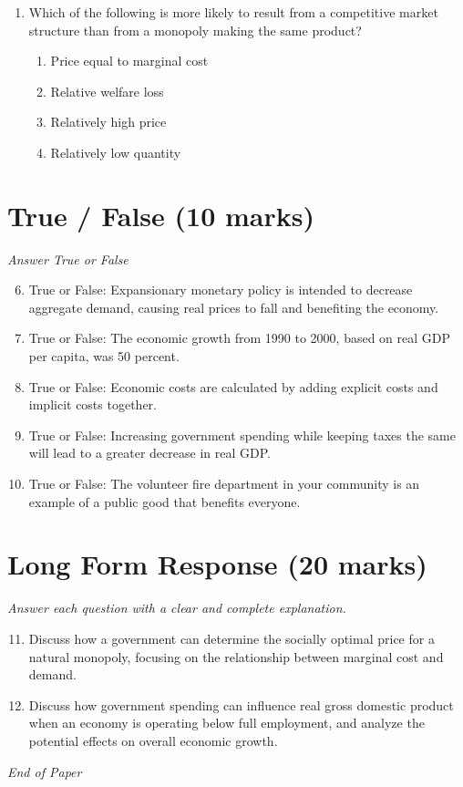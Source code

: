 \documentclass[12pt]{article}
\begin{document}
\begin{enumerate}[label=\arabic*.]
\begin{enumerate}[label=(\alph*)]
    \item The euro and other foreign currencies held by the Federal Reserve
    \item Gold bars in secure locations like Fort Knox
    \item The promise of the U.S. government to maintain its value
    \item The value of the actual paper on which it is printed.
\end{enumerate}
\item Which of the following is more likely to result from a competitive market structure than from a monopoly making the same product?
\begin{enumerate}[label=(\alph*)]
    \item Price equal to marginal cost
    \item Relative welfare loss
    \item Relatively high price
    \item Relatively low quantity
\end{enumerate}
\end{enumerate}

\section*{True / False (10 marks)}
\textit{Answer True or False}
\begin{enumerate}[label=\arabic*.]
\setcounter{enumi}{5}
\item True or False: Expansionary monetary policy is intended to decrease aggregate demand, causing real prices to fall and benefiting the economy.
\item True or False: The economic growth from 1990 to 2000, based on real GDP per capita, was 50 percent.
\item True or False: Economic costs are calculated by adding explicit costs and implicit costs together.
\item True or False: Increasing government spending while keeping taxes the same will lead to a greater decrease in real GDP.
\item True or False: The volunteer fire department in your community is an example of a public good that benefits everyone.
\end{enumerate}

\section*{Long Form Response (20 marks)}
\textit{Answer each question with a clear and complete explanation.}
\begin{enumerate}[label=\arabic*.]
\setcounter{enumi}{10}
\item Discuss how a government can determine the socially optimal price for a natural monopoly, focusing on the relationship between marginal cost and demand.
\item Discuss how government spending can influence real gross domestic product when an economy is operating below full employment, and analyze the potential effects on overall economic growth.
\end{enumerate}

\vfill
\noindent\textit{End of Paper}
\end{document}
